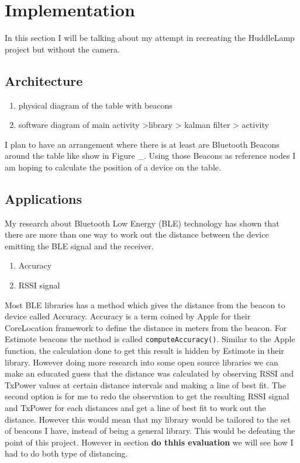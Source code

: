\section{Implementation}

In this section I will be talking about my attempt in recreating the HuddleLamp project but without the camera. 


\subsection{Architecture} \label{nocamer_architecture}
 \begin{enumerate}
 \item physical diagram of the table with beacons
 \item software diagram of main activity \-\->library \-\-> kalman filter \-\-> activity
 \end{enumerate}
 I plan to have an arrangement where there is at least are Bluetooth Beacons around the table like show in Figure \_. Using those Beacons as reference nodes I am hoping to calculate the position of a device on the table.

\subsection{Applications}
My research about Bluetooth Low Energy (BLE) technology has shown that there are more than one way to work out the distance between the device emitting the BLE signal and the receiver. 
\begin{enumerate}
\item Accuracy
\item RSSI signal
\end{enumerate}
Most BLE libraries has a method which gives the distance from the beacon to device called Accuracy. Accuracy is a term coined by Apple for their CoreLocation framework to define the distance in meters from the beacon. For Estimote beacons the method is called  \lstinline|computeAccuracy()|. Similar to the Apple function, the calculation done to get this result is hidden by Estimote in their library. However doing more research into some open source libraries \cite{radius-ranging, android_ibeacon_alt} we can make an educated guess that the distance was calculated by observing RSSI and TxPower values at certain distance intervals and making a line of best fit.
The second option is for me to redo the observation to get the resulting RSSI signal and TxPower for each distances and get a line of best fit to work out the distance. However this would mean that my library would be tailored to the set of beacons I have, instead of being a general library. This would be defeating the point of this project. However in section \textbf{do thhis evaluation} we will see how I had to do both type of distancing.

